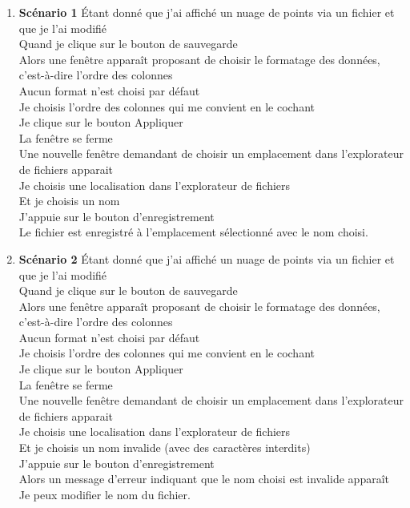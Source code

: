 \documentclass[12pt,titlepage,french]{article}
\begin{document}
\begin{enumerate}
\begin{enumerate}
    \item \textbf{Scénario 1}
Étant donné que j'ai affiché un nuage de points via un fichier et que je l'ai modifié\\
Quand je clique sur le bouton de sauvegarde\\
Alors une fenêtre apparaît proposant de choisir le formatage des données, c'est-à-dire l'ordre des colonnes\\
Aucun format n'est choisi par défaut\\
Je choisis l'ordre des colonnes qui me convient en le cochant\\
Je clique sur le bouton Appliquer\\
La fenêtre se ferme\\
Une nouvelle fenêtre demandant de choisir un emplacement dans l'explorateur de fichiers apparait\\
Je choisis une localisation dans l'explorateur de fichiers\\
Et je choisis un nom\\
J'appuie sur le bouton d'enregistrement\\
Le fichier est enregistré à l'emplacement sélectionné avec le nom choisi.

    \item \textbf{Scénario 2}
Étant donné que j'ai affiché un nuage de points via un fichier et que je l'ai modifié\\
Quand je clique sur le bouton de sauvegarde\\
Alors une fenêtre apparaît proposant de choisir le formatage des données, c'est-à-dire l'ordre des colonnes\\
Aucun format n'est choisi par défaut\\
Je choisis l'ordre des colonnes qui me convient en le cochant\\
Je clique sur le bouton Appliquer\\
La fenêtre se ferme\\
Une nouvelle fenêtre demandant de choisir un emplacement dans l'explorateur de fichiers apparait\\
Je choisis une localisation dans l'explorateur de fichiers\\
Et je choisis un nom invalide (avec des caractères interdits)\\
J'appuie sur le bouton d'enregistrement\\
Alors un message d'erreur indiquant que le nom choisi est invalide apparaît\\
Je peux modifier le nom du fichier.


\end{enumerate}
\end{enumerate}
\end{document}

